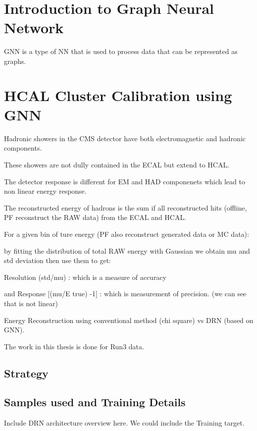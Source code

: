 
\section{Introduction to Graph Neural Network}
GNN is a type of NN that is used to process data that can be represented as graphs.

\section{HCAL Cluster Calibration using GNN}

Hadronic showers in the CMS detector have both electromagnetic and hadronic components.

These showers are not dully contained in the ECAL but extend to HCAL.

The detector response is different for EM and HAD componenets which lead to non linear energy response.

The reconstructed energy of hadrons is the sum if all reconstructed hits (offline, PF reconstruct the RAW data) from the ECAL and HCAL.

For a given bin of ture energy (PF also reconstruct generated data or MC data):

by fitting the distribution of total RAW energy with Gaussian we obtain mu and std deviation then use them to get:

Resolution (std/mu) : which is a measure of accuracy

and Response [(mu/E true) -1] : which is measurement of precision. (we can see that is not linear)

Energy Reconstruction using conventional method (chi square) vs DRN (based on GNN).

The work in this thesis is done for Run3 data. 


\subsection{Strategy}


\subsection{Samples used and Training Details}

Include DRN architecture overview here. We could include the Training target.  

